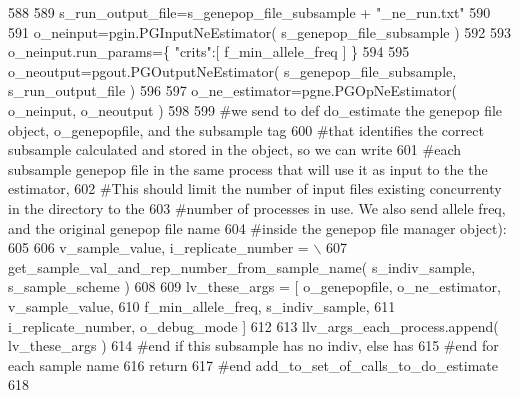 \begin{DoxyCode}
588 
589             s\_run\_output\_file=s\_genepop\_file\_subsample + \textcolor{stringliteral}{"\_ne\_run.txt"}
590 
591             o\_neinput=pgin.PGInputNeEstimator( s\_genepop\_file\_subsample )
592 
593             o\_neinput.run\_params=\{ \textcolor{stringliteral}{"crits"}:[ f\_min\_allele\_freq ]  \}
594 
595             o\_neoutput=pgout.PGOutputNeEstimator( s\_genepop\_file\_subsample, s\_run\_output\_file ) 
596 
597             o\_ne\_estimator=pgne.PGOpNeEstimator( o\_neinput, o\_neoutput ) 
598 
599             \textcolor{comment}{#we send to def do\_estimate the genepop file object, o\_genepopfile, and the subsample tag}
600             \textcolor{comment}{#that identifies the correct subsample calculated and stored in the object, so we can write}
601             \textcolor{comment}{#each subsample genepop file in the same process that will use it as input to the the
       estimator, }
602             \textcolor{comment}{#This should limit the number of input files existing concurrenty in the directory to the }
603             \textcolor{comment}{#number of processes in use.  We also send allele freq, and the original genepop file name }
604             \textcolor{comment}{#inside the genepop file manager object):}
605 
606             v\_sample\_value, i\_replicate\_number = \(\backslash\)
607                     get\_sample\_val\_and\_rep\_number\_from\_sample\_name( s\_indiv\_sample, s\_sample\_scheme )
608 
609             lv\_these\_args = [ o\_genepopfile,  o\_ne\_estimator, v\_sample\_value, 
610                                 f\_min\_allele\_freq, s\_indiv\_sample, 
611                                 i\_replicate\_number, o\_debug\_mode ]
612 
613             llv\_args\_each\_process.append( lv\_these\_args )
614         \textcolor{comment}{#end if this subsample has no indiv, else has}
615     \textcolor{comment}{#end for each sample name}
616     \textcolor{keywordflow}{return}
617 \textcolor{comment}{#end add\_to\_set\_of\_calls\_to\_do\_estimate}
618 
\end{DoxyCode}
